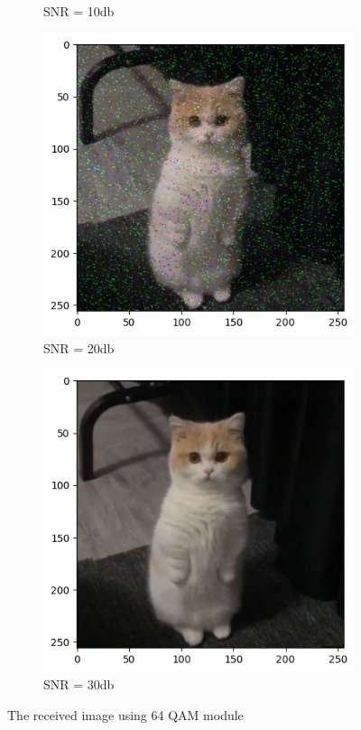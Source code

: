 \begin{figure}[htbp]
\begin{subfigure}[t]{0.49\linewidth}
        \caption{SNR = 10db}
        \label{10db}
    \end{subfigure}
    \hfil
    \begin{subfigure}[t]{0.49\linewidth}
        \includegraphics[width=\linewidth]{../Source/results/output_20db}
        \caption{SNR = 20db}
        \label{20db}
    \end{subfigure}
    \hfil
    \begin{subfigure}[t]{0.49\linewidth}
        \includegraphics[width=\linewidth]{../Source/results/output_30db}
        \caption{SNR = 30db}
        \label{30db}
    \end{subfigure}
    \caption{The received image using 64 QAM module}
    \label{output}
\end{figure}

